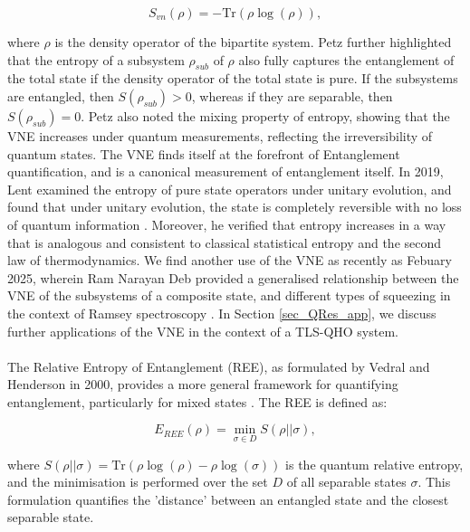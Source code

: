 \documentclass[12pt,a4paper]{article}
\begin{document}
\begin{equation}
    S_{vn}(\rho) = -\text{Tr}(\rho\log({\rho})),
\end{equation}

where $\rho$ is the density operator of the bipartite system. Petz further highlighted that the entropy of a subsystem $\rho_{sub}$ of $\rho$ also fully captures the entanglement of the total state if the density operator of the total state is pure. If the subsystems are entangled, then $S(\rho_{sub}) > 0$, whereas if they are separable, then $S(\rho_{sub}) = 0$. Petz also noted the mixing property of entropy, showing that the VNE increases under quantum measurements, reflecting the irreversibility of quantum states. The VNE finds itself at the forefront of Entanglement quantification, and is a canonical measurement of entanglement itself. In 2019, Lent examined the entropy of pure state operators under unitary evolution, and found that under unitary evolution, the state is completely reversible with no loss of quantum information \cite{Entanglement2019_VNE_example}. Moreover, he verified that entropy increases in a way that is analogous and consistent to classical statistical entropy and the second law of thermodynamics. We find another use of the VNE as recently as Febuary 2025, wherein Ram Narayan Deb provided a generalised relationship between the VNE of the subsystems of a composite state, and different types of squeezing in the context of Ramsey spectroscopy \cite{Entanglement2025_VNE_example}. In Section \ref{sec_QRes_app}, we discuss further applications of the VNE in the context of a TLS-QHO system. \\
\\
The Relative Entropy of Entanglement (REE), as formulated by Vedral and Henderson in 2000, provides a more general framework for quantifying entanglement, particularly for mixed states \cite{Entanglement2000-REE_definition}. The REE is defined as: 

\begin{equation}
    E_{REE}(\rho) = \min_{\sigma \in D}  S(\rho||\sigma),
\end{equation}

where $ S(\rho||\sigma) = \text{Tr}(\rho\log(\rho) - \rho\log(\sigma))$ is the quantum relative entropy, and the minimisation is performed over the set $D$ of all separable states $\sigma$. This formulation quantifies the 'distance' between an entangled state and the closest separable state. 
\end{document}
